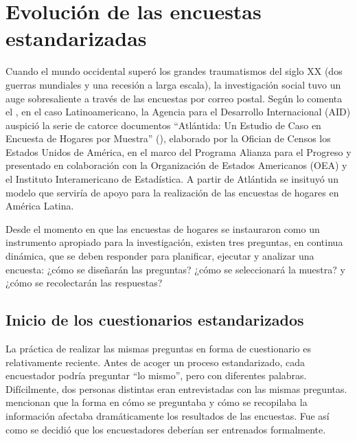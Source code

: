 \documentclass[
  12pt,
]{book}
\begin{document}
\hypertarget{evoluciuxf3n-de-las-encuestas-estandarizadas}{%
\section{Evolución de las encuestas estandarizadas}\label{evoluciuxf3n-de-las-encuestas-estandarizadas}}

Cuando el mundo occidental superó los grandes traumatismos del siglo XX (dos guerras mundiales y una recesión a larga escala), la investigación social tuvo un auge sobresaliente a través de las encuestas por correo postal. Según lo comenta el \citet{INE2012}, en el caso Latinoamericano, la Agencia para el Desarrollo Internacional (AID) auspició la serie de catorce documentos ``Atlántida: Un Estudio de Caso en Encuesta de Hogares por Muestra'' (\citet{Atlantida}), elaborado por la Ofician de Censos los Estados Unidos de América, en el marco del Programa Alianza para el Progreso y presentado en colaboración con la Organización de Estados Americanos (OEA) y el Instituto Interamericano de Estadística. A partir de Atlántida se insituyó un modelo que serviría de apoyo para la realización de las encuestas de hogares en América Latina.

Desde el momento en que las encuestas de hogares se instauraron como un instrumento apropiado para la investigación, existen tres preguntas, en continua dinámica, que se deben responder para planificar, ejecutar y analizar una encuesta: ¿cómo se diseñarán las preguntas? ¿cómo se seleccionará la muestra? y ¿cómo se recolectarán las respuestas?

\hypertarget{inicio-de-los-cuestionarios-estandarizados}{%
\subsection{Inicio de los cuestionarios estandarizados}\label{inicio-de-los-cuestionarios-estandarizados}}

La práctica de realizar las mismas preguntas en forma de cuestionario es relativamente reciente. Antes de acoger un proceso estandarizado, cada encuestador podría preguntar ``lo mismo'', pero con diferentes palabras. Difícilmente, dos personas distintas eran entrevistadas con las mismas preguntas. \citet{Groves_Fowler_Couper_Lepkowski_Singer_Tourangeau_2009} mencionan que la forma en cómo se preguntaba y cómo se recopilaba la información afectaba dramáticamente los resultados de las encuestas. Fue así como se decidió que los encuestadores deberían ser entrenados formalmente.
\end{document}
